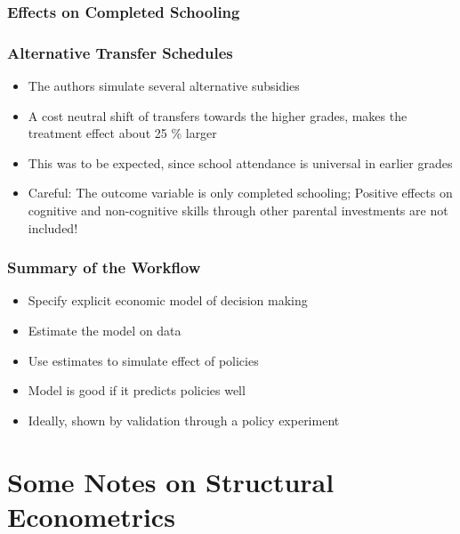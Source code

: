 \documentclass[11pt]{beamer}
\begin{document}
\begin{frame}[c]\frametitle{Effects on Completed Schooling}
    \begin{centering}
        \resizebox{\textwidth}{!}{}
    \end{centering}
\end{frame}


\begin{frame}[c]\frametitle{Alternative Transfer Schedules}
    \begin{itemize}
        \item The authors simulate several alternative subsidies
        \item A cost neutral shift of transfers towards the higher grades, makes the treatment effect about 25 \% larger
        \item This was to be expected, since school attendance is universal in earlier grades
        \item \alert{Careful}: The outcome variable is only completed schooling; Positive effects on cognitive and non-cognitive skills through other parental investments are not included!
    \end{itemize}
\end{frame}


\begin{frame}[c]\frametitle{Summary of the Workflow}
    \begin{itemize}
        \item Specify explicit economic model of decision making
        \item Estimate the model on data
        \item Use estimates to simulate effect of policies
        \item Model is good if it predicts policies well
        \item Ideally, shown by validation through a policy experiment
    \end{itemize}
\end{frame}


\section{Some Notes on Structural Econometrics}
\end{document}
